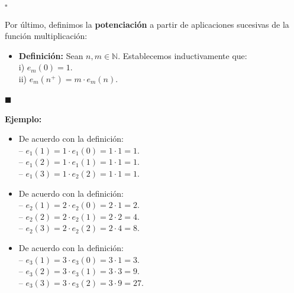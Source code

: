 \documentclass[10 pt]{article}
\begin{document}
\begin{flushright}
    $\square$
\end{flushright}

\Large{Por último, definimos la \textbf{potenciación} a partir de aplicaciones sucesivas de la función multiplicación:} \\

\begin{itemize}
    \item \Large{\textbf{Definición:} Sean $n,m \in \mathbb N$. Establecemos inductivamente que: \\

    i) $e_m(0)=1$. \\

    ii) $e_m(n^+)=m \cdot e_m(n)$.} \\
\end{itemize}

\begin{flushright}
$\blacksquare$
\end{flushright}

\Large{\textbf{Ejemplo:}} \\

\begin{itemize}
    \item \Large{De acuerdo con la definición: \\

    -- $e_1(1)=1 \cdot e_1(0)=1 \cdot 1=1$. \\

    -- $e_1(2)=1 \cdot e_1(1)=1 \cdot 1=1$. \\

    -- $e_1(3)=1 \cdot e_2(2)=1 \cdot 1=1$.}\\

    \item \Large{De acuerdo con la definición: \\

    -- $e_2(1)=2 \cdot e_2(0)=2 \cdot 1=2$. \\

    -- $e_2(2)=2 \cdot e_2(1)=2 \cdot 2=4$. \\

    -- $e_2(3)=2 \cdot e_2(2)=2 \cdot 4=8$.} \\

    \item \Large{De acuerdo con la definición: \\

    -- $e_3(1)=3 \cdot e_3(0)=3 \cdot 1=3$. \\

    -- $e_3(2)=3 \cdot e_3(1)=3 \cdot 3=9$. \\

    -- $e_3(3)=3 \cdot e_3(2)=3 \cdot 9=27$.}\\
\end{itemize}
\end{document}
